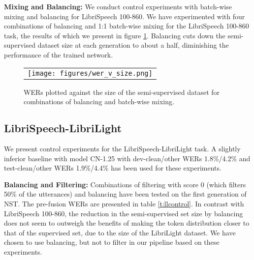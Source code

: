 \documentclass[a4paper]{article}
\begin{document}
\noindent\textbf{Mixing and Balancing:}  We conduct control experiments with batch-wise mixing and balancing for LibriSpeech 100-860. We have experimented with four combinations of balancing and 1:1 batch-wise mixing for the LibriSpeech 100-860 task, the results of which we present in figure \ref{f:bm}. Balancing cuts down the semi-supervised dataset size at each generation to about a half, diminishing the performance of the trained network.

\begin{figure}[h]
  \centering
  \begin{tabular}{c}
  \texttt{[image: figures/wer\_v\_size.png]}
  \end{tabular}
  \vskip -0.05in
  \caption{WERs plotted against the size of the semi-supervised dataset for combinations of balancing and batch-wise mixing.}
  \label{f:bm}
  \vskip -0.15in
\end{figure}

\subsection{LibriSpeech-LibriLight}

We present control experiments for the LibriSpeech-LibriLight task. A slightly inferior baseline with model CN-1.25 with dev-clean/other WERs 1.8\%/4.2\% and test-clean/other WERs 1.9\%/4.4\% has been used for these experiments.
\smallskip

\noindent\textbf{Balancing and Filtering:} Combinations of filtering with score 0 (which filters  50\% of the utterances) and balancing have been tested on the first generation of NST. The pre-fusion WERs are presented in table \ref{t:llcontrol}. In contrast with LibriSpeech 100-860, the reduction in the semi-supervised set size by balancing does not seem to outweigh the benefits of making the token distribution closer to that of the supervised set, due to the size of the LibriLight dataset. We have chosen to use balancing, but not to filter in our pipeline based on these experiments.

\begin{table}[h!]
  \vskip -0.05in
  \caption{WERs (\%) for balancing and filtering configurations.}
  \label{t:llcontrol}
  \vskip -0.05in
  \centering
  \small
  \vskip -0.05in
\end{table}
\end{document}
